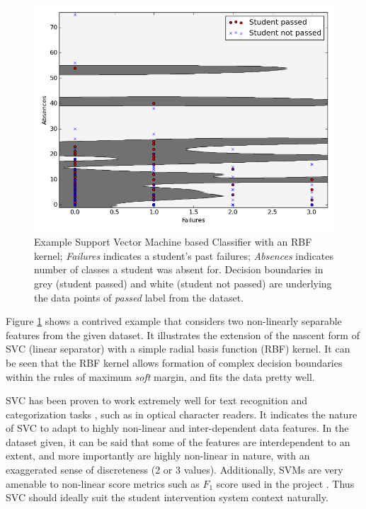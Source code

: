\documentclass{article}
\begin{document}
	\begin{figure}[!ht]
		\centering
		\includegraphics[scale=0.5]{example_svc}
		\caption{Example Support Vector Machine based Classifier with an RBF kernel; \emph{Failures} indicates a student's past failures; \emph{Absences} indicates number of classes a student was absent for. Decision boundaries in grey (student passed) and white (student not passed) are underlying the data points of \emph{passed} label from the dataset.}
		\label{fig:svc_rbf_example}
	\end{figure}
	
	Figure \ref{fig:svc_rbf_example} shows a contrived example that considers two non-linearly separable features from the given dataset. It illustrates the extension of the nascent form of SVC (linear separator) with a simple radial basis function (RBF) kernel. It can be seen that the RBF kernel allows formation of complex decision boundaries within the rules of maximum \emph{soft} margin, and fits the data pretty well. 
	
	SVC has been proven to work extremely well for text recognition and categorization tasks \cite{boser1992,joachims1998}, such as in optical character readers. It indicates the nature of SVC to adapt to highly non-linear and inter-dependent data features. In the dataset given, it can be said that some of the features are interdependent to an extent, and more importantly are highly non-linear in nature, with an exaggerated sense of discreteness (2 or 3 values). Additionally, SVMs are very amenable to non-linear score metrics such as $F_1$ score used in the project \cite{joachims2005}. Thus SVC should ideally suit the student intervention system context naturally.
	
\end{document}
